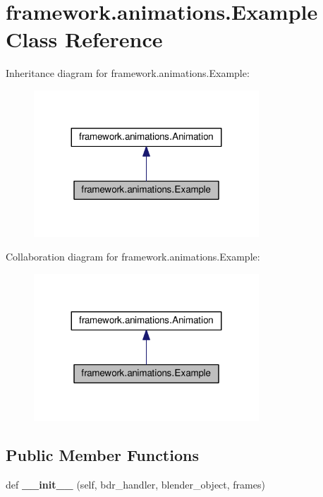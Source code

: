 \hypertarget{classframework_1_1animations_1_1Example}{}\section{framework.\+animations.\+Example Class Reference}
\label{classframework_1_1animations_1_1Example}


Inheritance diagram for framework.\+animations.\+Example\+:
\nopagebreak
\begin{figure}[H]
\begin{center}
\leavevmode
\includegraphics[width=239pt]{classframework_1_1animations_1_1Example__inherit__graph}
\end{center}
\end{figure}


Collaboration diagram for framework.\+animations.\+Example\+:
\nopagebreak
\begin{figure}[H]
\begin{center}
\leavevmode
\includegraphics[width=239pt]{classframework_1_1animations_1_1Example__coll__graph}
\end{center}
\end{figure}
\subsection*{Public Member Functions}
\begin{DoxyCompactItemize}
\item 
def {\bfseries \+\_\+\+\_\+init\+\_\+\+\_\+} (self, bdr\+\_\+handler, blender\+\_\+object, frames)\hypertarget{classframework_1_1animations_1_1Example_a065bdcf4353bb897272e0105bc31737e}{}\label{classframework_1_1animations_1_1Example_a065bdcf4353bb897272e0105bc31737e}

\end{DoxyCompactItemize}
